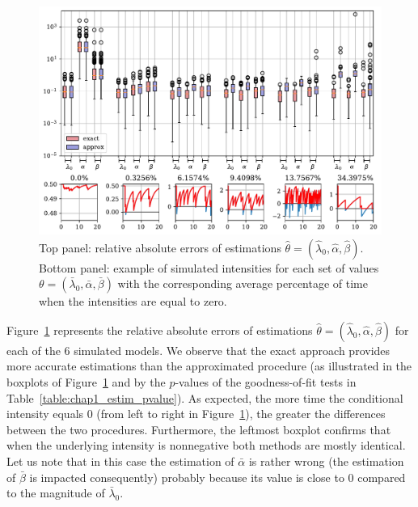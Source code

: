 \begin{figure}[!ht]
  \centering
    \includegraphics[width=\textwidth]{images/chapter2/intensity_boxplot_log_cropped.pdf}%
  \caption{Top panel: relative absolute errors of estimations \(\hat \theta = (\hat \lambda_0, \hat \alpha, \hat \beta)\).
  Bottom panel: example of simulated intensities for each set of values $ \theta = ( \bar \lambda_0,  \bar \alpha,  \bar \beta)$  with the corresponding average percentage of time when the intensities are equal to zero.
  }
  \label{fig:chap1_boxplot_intensity}
\end{figure}

Figure~\ref{fig:chap1_boxplot_intensity} represents the relative absolute errors of estimations \(\hat \theta = (\hat \lambda_0, \hat \alpha, \hat \beta)\) for each of the 6 simulated models.
We observe that the exact approach provides more accurate estimations than the approximated procedure (as illustrated in the boxplots of Figure~\ref{fig:chap1_boxplot_intensity} and by the \(p\)-values of the goodness-of-fit tests in Table~\ref{table:chap1_estim_pvalue}). As expected, the more time the conditional intensity equals 0 (from left to right in Figure~\ref{fig:chap1_boxplot_intensity}), the greater the differences between the two procedures.
Furthermore, the leftmost boxplot confirms that when the underlying intensity is nonnegative both methods are mostly identical.
Let us note that in this case the estimation of \(\bar \alpha\) is rather wrong (the estimation of \(\bar \beta\) is impacted consequently) probably because its value is close to \(0\) compared to the magnitude of \(\bar \lambda_0\).

